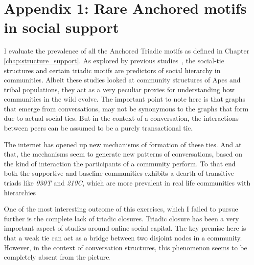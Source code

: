 \chapter{Appendix 1: Rare Anchored motifs in social support}

\makeatletter
{}
\makeatother

\graphicspath{{Chapter3/plots/}{Chapter3/plots/figures/}{Chapter3/plots/Zscore/}}

I evaluate the prevalence of all the Anchored Triadic motifs as defined in Chapter \ref{chap:structure_support}. As explored by previous studies~\cite{shizuka2015network,shizuka2012social,holland1976local,doi:10.1177/104649647100200201}, the social-tie structures and certain triadic motifs are predictors of social hierarchy in communities. Albeit these studies looked at community structures of Apes and tribal populations, they act as a very peculiar proxies for understanding how communities in the wild evolve. The important point to note here is that graphs that emerge from conversations, may not be synonymous to the graphs that form due to actual social ties. But in the context of a conversation, the interactions between peers can be assumed to be a purely transactional tie. 

The internet has opened up new mechanisms of formation of these ties. And at that, the mechanisms seem to generate new patterns of conversations, based on the kind of interaction the participants of a community perform. To that end both the supportive and baseline communities exhibits a dearth of transitive triads like \textsl{030T} and \textsl{210C}, which are more prevalent in real life communities with hierarchies

One of the most interesting outcome of this exercises, which I failed to pursue further is the complete lack of triadic closures. Triadic closure has been a very important aspect of studies around online social capital. The key premise here is that a weak tie can act as a bridge between two disjoint nodes in a community. However, in the context of conversation structures, this phenomenon seems to be completely absent from the picture.


